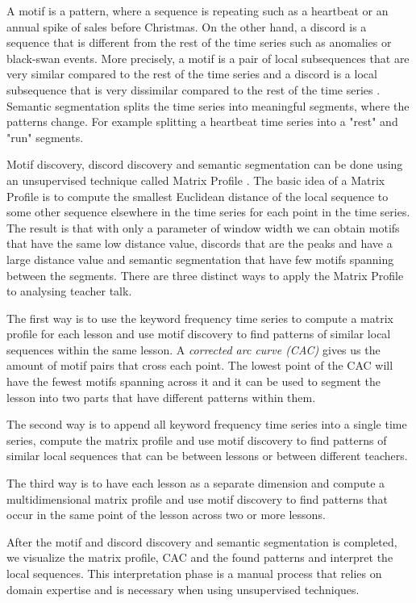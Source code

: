 \documentclass[utf8,english]{gradu3}
\begin{document}
A motif is a pattern, where a sequence is repeating such as a heartbeat or an annual spike of sales before Christmas. On the other hand, a discord is a sequence that is different from the rest of the time series such as anomalies or black-swan events. More precisely, a motif is a pair of local subsequences that are very similar compared to the rest of the time series and a discord is a local subsequence that is very dissimilar compared to the rest of the time series \parencite{yehUniversalTimeSeries2018}. Semantic segmentation splits the time series into meaningful segments, where the patterns change. For example splitting a heartbeat time series into a "rest" and "run" segments.

Motif discovery, discord discovery and semantic segmentation can be done using an unsupervised technique called Matrix Profile \parencite{yehUniversalTimeSeries2018}. The basic idea of a Matrix Profile is to compute the smallest Euclidean distance of the local sequence to some other sequence elsewhere in the time series for each point in the time series. The result is that with only a parameter of window width we can obtain motifs that have the same low distance value, discords that are the peaks and have a large distance value and semantic segmentation that have few motifs spanning between the segments. There are three distinct ways to apply the Matrix Profile to analysing teacher talk.

The first way is to use the keyword frequency time series to compute a matrix profile for each lesson and use motif discovery to find patterns of similar local sequences within the same lesson. A \emph{corrected arc curve (CAC)} gives us the amount of motif pairs that cross each point. The lowest point of the CAC will have the fewest motifs spanning across it and it can be used to segment the lesson into two parts that have different patterns within them.

The second way is to append all keyword frequency time series into a single time series, compute the matrix profile and use motif discovery to find patterns of similar local sequences that can be between lessons or between different teachers. 

The third way is to have each lesson as a separate dimension and compute a multidimensional matrix profile and use motif discovery to find patterns that occur in the same point of the lesson across two or more lessons.

After the motif and discord discovery and semantic segmentation is completed, we visualize the matrix profile, CAC and the found patterns and interpret the local sequences. This interpretation phase is a manual process that relies on domain expertise and is necessary when using unsupervised techniques.
\end{document}
